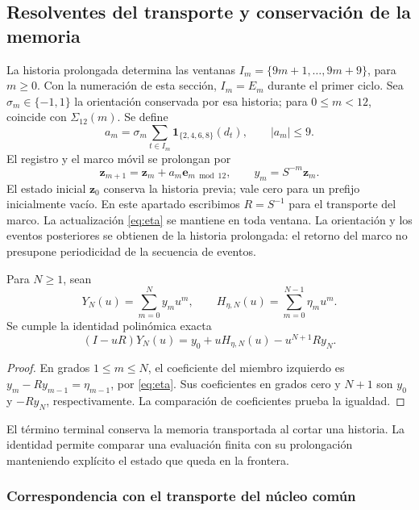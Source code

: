 \subsection{Resolventes del transporte y conservación de la memoria}
\label{subsec:ii-memoria-resolvente}

La historia prolongada determina las ventanas
\(I_m=\{9m+1,\ldots,9m+9\}\), para \(m\geq0\).
Con la numeración de esta sección, \(I_m=E_m\) durante el primer ciclo.
Sea \(\sigma_m\in\{-1,1\}\) la orientación conservada por esa historia;
para \(0\leq m<12\), coincide con \(\Sigma_{12}(m)\). Se define
\[
 a_m=\sigma_m\sum_{t\in I_m}\mathbf1_{\{2,4,6,8\}}(d_t),
 \qquad |a_m|\leq9.
\]
El registro y el marco móvil se prolongan por
\[
 \mathbf z_{m+1}=\mathbf z_m+a_m\mathbf e_{m\bmod12},\qquad y_m=S^{-m}\mathbf z_m.
\]
El estado inicial \(\mathbf z_0\) conserva la historia previa; vale cero para
un prefijo inicialmente vacío. En este apartado escribimos
\(R=S^{-1}\) para el transporte del marco. La actualización
\eqref{eq:eta} se mantiene en toda ventana. La orientación y los eventos
posteriores se obtienen de la historia prolongada: el retorno del marco
no presupone periodicidad de la secuencia de eventos.

\begin{proposition}
Para $N\geq1$, sean
\[
Y_N(u)=\sum_{m=0}^N y_mu^m,\qquad
H_{\eta,N}(u)=\sum_{m=0}^{N-1}\eta_mu^m.
\]
Se cumple la identidad polinómica exacta
\begin{equation}
(I-uR)Y_N(u)=y_0+uH_{\eta,N}(u)-u^{N+1}Ry_N.
\label{mem:identidad-finita}
\end{equation}
\end{proposition}
\begin{proof}
En grados $1\leq m\leq N$, el coeficiente del miembro izquierdo es
$y_m-Ry_{m-1}=\eta_{m-1}$, por \eqref{eq:eta}.
Sus coeficientes en grados cero y $N+1$ son $y_0$ y $-Ry_N$,
respectivamente. La comparación de coeficientes prueba la igualdad.
\end{proof}

El término terminal conserva la memoria transportada al cortar una historia.
La identidad permite comparar una evaluación finita con su prolongación
manteniendo explícito el estado que queda en la frontera.

\subsubsection{Correspondencia con el transporte del núcleo común}

